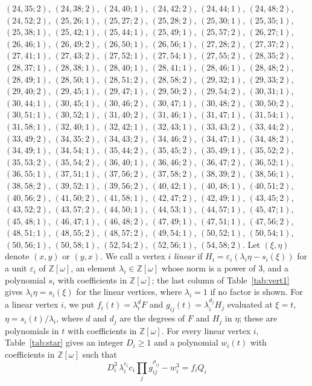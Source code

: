 \documentclass[11pt]{article}
\newcommand{\Z}{\mathbb{Z}}
\begin{document}
$(24,35;2)$, $(24,38;2)$, $(24,40;1)$, $(24,42;2)$, $(24,44;1)$, $(24,48;2)$, $(24,52;2)$, $(25,26;1)$, $(25,27;2)$, $(25,28;2)$, $(25,30;1)$, $(25,35;1)$, $(25,38;1)$, $(25,42;1)$, $(25,44;1)$, $(25,49;1)$, $(25,57;2)$, $(26,27;1)$, $(26,46;1)$, $(26,49;2)$, $(26,50;1)$, $(26,56;1)$, $(27,28;2)$, $(27,37;2)$, $(27,41;1)$, $(27,43;2)$, $(27,52;1)$, $(27,54;1)$, $(27,55;2)$, $(28,35;2)$, $(28,37;1)$, $(28,38;1)$, $(28,40;1)$, $(28,41;1)$, $(28,46;1)$, $(28,48;2)$, $(28,49;1)$, $(28,50;1)$, $(28,51;2)$, $(28,58;2)$, $(29,32;1)$, $(29,33;2)$, $(29,40;2)$, $(29,45;1)$, $(29,47;1)$, $(29,50;2)$, $(29,54;2)$, $(30,31;1)$, $(30,44;1)$, $(30,45;1)$, $(30,46;2)$, $(30,47;1)$, $(30,48;2)$, $(30,50;2)$, $(30,51;1)$, $(30,52;1)$, $(31,40;2)$, $(31,46;1)$, $(31,47;1)$, $(31,54;1)$, $(31,58;1)$, $(32,40;1)$, $(32,42;1)$, $(32,43;1)$, $(33,43;2)$, $(33,44;2)$, $(33,49;2)$, $(34,35;2)$, $(34,43;2)$, $(34,46;2)$, $(34,47;1)$, $(34,48;2)$, $(34,49;1)$, $(34,54;1)$, $(35,44;2)$, $(35,45;2)$, $(35,49;1)$, $(35,52;2)$, $(35,53;2)$, $(35,54;2)$, $(36,40;1)$, $(36,46;2)$, $(36,47;2)$, $(36,52;1)$, $(36,55;1)$, $(37,51;1)$, $(37,56;2)$, $(37,58;2)$, $(38,39;2)$, $(38,56;1)$, $(38,58;2)$, $(39,52;1)$, $(39,56;2)$, $(40,42;1)$, $(40,48;1)$, $(40,51;2)$, $(40,56;2)$, $(41,50;2)$, $(41,58;1)$, $(42,47;2)$, $(42,49;1)$, $(43,45;2)$, $(43,52;2)$, $(43,57;2)$, $(44,50;1)$, $(44,53;1)$, $(44,57;1)$, $(45,47;1)$, $(45,48;1)$, $(46,47;1)$, $(46,48;2)$, $(47,49;1)$, $(47,51;1)$, $(47,56;2)$, $(48,51;1)$, $(48,55;2)$, $(48,57;2)$, $(49,54;1)$, $(50,52;1)$, $(50,54;1)$, $(50,56;1)$, $(50,58;1)$, $(52,54;2)$, $(52,56;1)$, $(54,58;2)$.
Let $(\xi,\eta)$ denote $(x,y)$ or $(y,x)$. We call a vertex $i$ \emph{linear} if $H_i=\varepsilon_i(\lambda_i\eta-s_i(\xi))$ for a unit $\varepsilon_i$ of $\Z[\omega]$, an element $\lambda_i\in\Z[\omega]$ whose norm is a power of $3$, and a polynomial $s_i$ with coefficients in $\Z[\omega]$; the last column of Table~\ref{tab:vert1} gives $\lambda_i\eta=s_i(\xi)$ for the linear vertices, where $\lambda_i=1$ if no factor is shown. For a linear vertex $i$, we put $f_i(t)=\lambda_i^{d}F$ and $g_{ij}(t)=\lambda_i^{d_j}H_j$ evaluated at $\xi=t$, $\eta=s_i(t)/\lambda_i$, where $d$ and $d_j$ are the degrees of $F$ and $H_j$ in $\eta$; these are polynomials in $t$ with coefficients in $\Z[\omega]$.
For every linear vertex $i$, Table~\ref{tab:star} gives an integer $D_i\geq1$ and a polynomial $w_i(t)$ with coefficients in $\Z[\omega]$ such that
\begin{equation}\label{eq:starlin}
D_i^3\,\lambda_i^{e_i}c_i\prod_jg_{ij}^{\rho_{ij}}-w_i^3=f_iQ_i
\end{equation}
\end{document}
